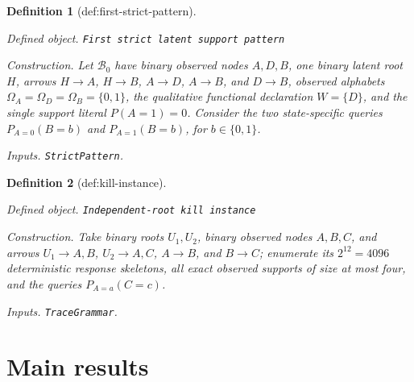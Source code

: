 \documentclass{article}
\newtheorem{definition}{Definition}
\begin{document}
\begin{definition}[def:first-strict-pattern]\label{def:first-strict-pattern}
\par\smallskip\noindent\emph{Defined object.} \texttt{First strict latent support pattern}
\par\smallskip\noindent\emph{Construction.} Let \(\mathcal B_0\) have binary observed nodes \(A,D,B\), one binary latent root \(H\), arrows \(H\to A\), \(H\to B\), \(A\to D\), \(A\to B\), and \(D\to B\), observed alphabets \(\Omega_A=\Omega_D=\Omega_B=\{0,1\}\), the qualitative functional declaration \(W=\{D\}\), and the single support literal \(P(A=1)=0\). Consider the two state-specific queries \(P_{A=0}(B=b)\) and \(P_{A=1}(B=b)\), for \(b\in\{0,1\}\).
\par\smallskip\noindent\emph{Inputs.} \texttt{StrictPattern}.
\end{definition}

\begin{definition}[def:kill-instance]\label{def:kill-instance}
\par\smallskip\noindent\emph{Defined object.} \texttt{Independent-\allowbreak{}root kill instance}
\par\smallskip\noindent\emph{Construction.} Take binary roots \(U_1,U_2\), binary observed nodes \(A,B,C\), and arrows \(U_1\to A,B\), \(U_2\to A,C\), \(A\to B\), and \(B\to C\); enumerate its \(2^{12}=4096\) deterministic response skeletons, all exact observed supports of size at most four, and the queries \(P_{A=a}(C=c)\).
\par\smallskip\noindent\emph{Inputs.} \texttt{TraceGrammar}.
\end{definition}

\section{Main results}
\end{document}

